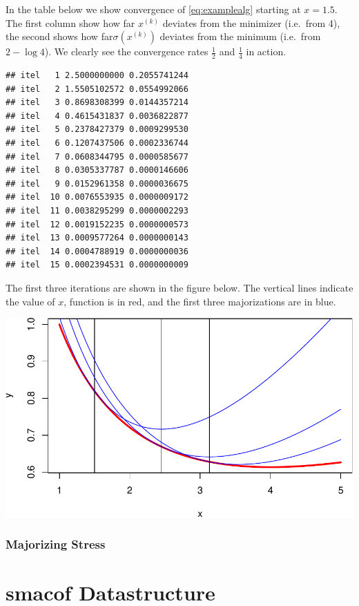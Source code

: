 \documentclass[
  12pt,
]{article}
\begin{document}
In the table below we show convergence of \eqref{eq:examplealg} starting
at \(x=1.5\). The first column show how far \(x^{(k)}\) deviates from the
minimizer (i.e.~from 4), the second shows how far\(\sigma(x^{(k)})\)
deviates from the minimum (i.e.~from \(2-\log 4\)). We clearly see the
convergence rates \(\frac12\) and \(\frac14\) in action.

\begin{verbatim}
## itel   1 2.5000000000 0.2055741244 
## itel   2 1.5505102572 0.0554992066 
## itel   3 0.8698308399 0.0144357214 
## itel   4 0.4615431837 0.0036822877 
## itel   5 0.2378427379 0.0009299530 
## itel   6 0.1207437506 0.0002336744 
## itel   7 0.0608344795 0.0000585677 
## itel   8 0.0305337787 0.0000146606 
## itel   9 0.0152961358 0.0000036675 
## itel  10 0.0076553935 0.0000009172 
## itel  11 0.0038295299 0.0000002293 
## itel  12 0.0019152235 0.0000000573 
## itel  13 0.0009577264 0.0000000143 
## itel  14 0.0004788919 0.0000000036 
## itel  15 0.0002394531 0.0000000009
\end{verbatim}

The first three iterations are shown in the figure below. The vertical
lines indicate the value of \(x\), function is in red, and the first three
majorizations are in blue.

\begin{center}\includegraphics{smacofIntro_files/figure-latex/majplot-1} \end{center}

\subsubsection{Majorizing Stress}\label{majorizing-stress}

\section{smacof Datastructure}\label{smacof-datastructure}
\end{document}
